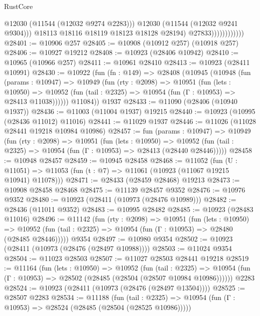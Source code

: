 \begin{lexlean}{RustCore}
\begin{coremodule}
                                  @12030
                                  (@11544 (@12032 @9274 @2283)))
                                @12030
                                (@11544 (@12032 @9241 @9304)))
                              @18113
                              @18116
                              @18119
                              @18123
                              @18128
                              @28194)
                            @27833))))))))))))
@28401 := @10906 @257
@28405 := @10908 (@10912 @257) (@10918 @257)
@28406 := @10927 @19212
@28408 := @10923 (@28406 @10942)
@28410 := @10965 (@10966 @257)
@28411 := @10961 @28410
@28413 := @10923 (@28411 @10991)
@28430 := @10922
    (fun (fn : @149) =>
    @28408
      (@10945
        (@10948
          (fun (params : @10947) =>
          @10949
            (fun (rty : @2098) =>
            @10951
              (fun (lets : @10950) =>
              @10952 (fun (tail : @2325) => @10954 (fun (Γ : @10953) => @28413 @11038))))))
        @11084))
    @1937
@28433 := @11090 (@28406 (@10940 @1937))
@28436 := @11003 (@11004 @1937) @19215
@28440 := @10923 (@10995 (@28436 @11012) @11016)
@28441 := @11029 @1937
@28446 := @11026 (@11028 @28441 @19218 @10984 @10986)
@28457 := fun (params : @10947) =>
  @10949
    (fun (rty : @2098) =>
    @10951
      (fun (lets : @10950) =>
      @10952 (fun (tail : @2325) => @10954 (fun (Γ : @10953) => @28413 (@28440 @28446)))))
@28458 := @10948 @28457
@28459 := @10945 @28458
@28468 := @11052
    (fun (U : @11051) => @11053 (fun (t : @7) => @11061 (@10923 (@11067 @19215 @10941) @11078)))
@28471 := @28433 (@28459 @28468) @19213
@28473 := @10908 @28458 @28468
@28475 := @11139 @28457 @9352
@28476 := @10976 @9352
@28480 := @10923 (@28411 (@10973 (@28476 @10989)))
@28482 := @28436 (@11011 @9352)
@28483 := @10995 @28482
@28485 := @10923 (@28483 @11016)
@28496 := @11142
    (fun (rty : @2098) =>
    @10951
      (fun (lets : @10950) =>
      @10952 (fun (tail : @2325) => @10954 (fun (Γ : @10953) => @28480 (@28485 @28446)))))
    @9354
@28497 := @10980 @9354
@28502 := @10923 (@28411 (@10973 (@28476 (@28497 @10988))))
@28503 := @11024 @9354
@28504 := @11023 @28503
@28507 := @11027 @28503 @28441 @19218
@28519 := @11164
    (fun (lets : @10950) =>
    @10952
      (fun (tail : @2325) =>
      @10954 (fun (Γ : @10953) => @28502 (@28485 (@28504 (@28507 @10984 @10986))))))
    @2283
@28524 := @10923 (@28411 (@10973 (@28476 (@28497 @13504))))
@28525 := @28507 @2283
@28534 := @11188
    (fun (tail : @2325) => @10954 (fun (Γ : @10953) => @28524 (@28485 (@28504 (@28525 @10986)))))

\end{coremodule}
\end{lexlean}
